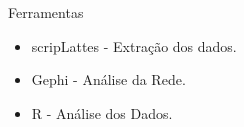 \documentclass{beamer}
\begin{document}
\begin{frame} {Ferramentas}

\begin{block}{}
\begin{itemize}
\item scripLattes - Extração dos dados.
\end{itemize}
\end{block}

\begin{block}{}
\begin{itemize}
\item Gephi - Análise da Rede.
\end{itemize}
\end{block}

\begin{block}{}
\begin{itemize}
\item R - Análise dos Dados.
\end{itemize}
\end{block}

\end{frame}
\end{document}
